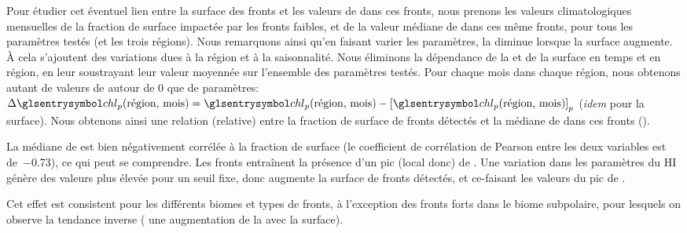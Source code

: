 Pour étudier cet éventuel lien entre la surface des fronts et les valeurs de  dans ces fronts, nous prenons les valeurs climatologiques mensuelles de la fraction de surface impactée par les fronts faibles, et de la valeur médiane de  dans ces même fronts, pour tous les paramètres testés (et les trois régions). Nous remarquons ainsi qu'en faisant varier les paramètres, la  diminue lorsque la surface augmente.
À cela s'ajoutent des variations dues à la région et à la saisonnalité.
Nous éliminons la dépendance de la  et de la surface en temps et en région, en leur soustrayant leur valeur moyennée sur l'ensemble des paramètres testés.
Pour chaque mois dans chaque région, nous obtenons autant de valeurs de  autour de \num{0} que de paramètres: \(\Delta\am{chl}_p(\text{région, mois}) = \am{chl}_p(\text{région, mois}) - \moy{\am{chl}_p(\text{région, mois})}_p\) (\emph{idem} pour la surface).
Nous obtenons ainsi une relation (relative) entre la fraction de surface de fronts détectés et la médiane de  dans ces fronts ().

\begin{figure}
  \centering
  \label{fig:sensibilite-surface}
\end{figure}

La médiane de  est bien négativement corrélée à la fraction de surface (le coefficient de corrélation de Pearson entre les deux variables est de~\num{-0.73}), ce qui peut se comprendre.
Les fronts entraînent la présence d'un pic (local donc) de .
Une variation dans les paramètres du HI génère des valeurs plus élevée pour un seuil fixe, donc augmente la surface de fronts détectés, et ce-faisant  les valeurs du pic de .

Cet effet est consistent pour les différents biomes et types de fronts, à l'exception des fronts forts dans le biome subpolaire, pour lesquels on observe la tendance inverse ( une augmentation de la  avec la surface).

